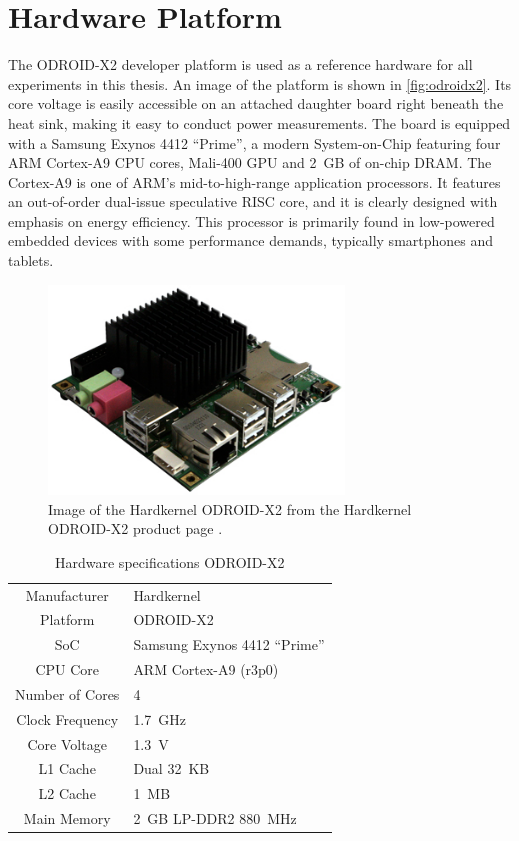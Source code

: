 \section{Hardware Platform}

The ODROID-X2 developer platform \cite{hardkernelodroidx2} is used as a
reference hardware for all experiments in this thesis. An image of the platform
is shown in \autoref{fig:odroidx2}. Its core voltage is easily accessible on an
attached daughter board right beneath the heat sink, making it easy to conduct
power measurements. The board is equipped with a Samsung Exynos 4412 ``Prime'',
a modern System-on-Chip featuring four ARM Cortex-A9 CPU cores, Mali-400 GPU and
2~GB of on-chip DRAM. The Cortex-A9 is one of ARM's mid-to-high-range application
processors. It features an out-of-order dual-issue speculative RISC core, and it
is clearly designed with emphasis on energy efficiency. This processor is
primarily found in low-powered embedded devices with some performance demands,
typically smartphones and tablets.

\begin{figure}[bth]
    \centering
    \includegraphics[width=0.7\textwidth]{figs/odroid.jpg}
    \caption{Image of the Hardkernel ODROID-X2 from the Hardkernel ODROID-X2
    product page \cite{hardkernelodroidx2}.}
    \label{fig:odroidx2}
\end{figure}

\begin{table}
    \centering
    \begin{tabular}{|c|l|}
        \rowcolor{gray!25}
        \hline
        Manufacturer   & Hardkernel \\
        Platform       & ODROID-X2 \\
        SoC            & Samsung Exynos 4412 ``Prime'' \\
        CPU Core       & ARM Cortex-A9 (r3p0) \\
        Number of Cores& 4 \\
        Clock Frequency& 1.7~GHz \\
        Core Voltage   & 1.3~V \\
        L1 Cache       & Dual 32~KB \\
        L2 Cache       & 1~MB \\
        Main Memory    & 2~GB LP-DDR2 880~MHz \\
        \hline
    \end{tabular}
    \caption{Hardware specifications ODROID-X2}
    \label{tab:hwspecx2}
\end{table}

